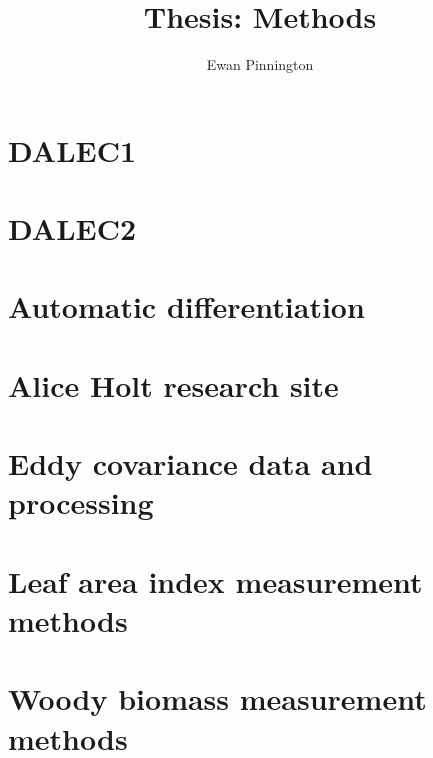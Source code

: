 \documentclass[11pt]{article}
\title{Thesis: Methods}
\author{Ewan Pinnington}
\begin{document}
\maketitle

\section{DALEC1}

\section{DALEC2}

\section{Automatic differentiation}

\section{Alice Holt research site}

\section{Eddy covariance data and processing}

\section{Leaf area index measurement methods}

\section{Woody biomass measurement methods}
\end{document}
